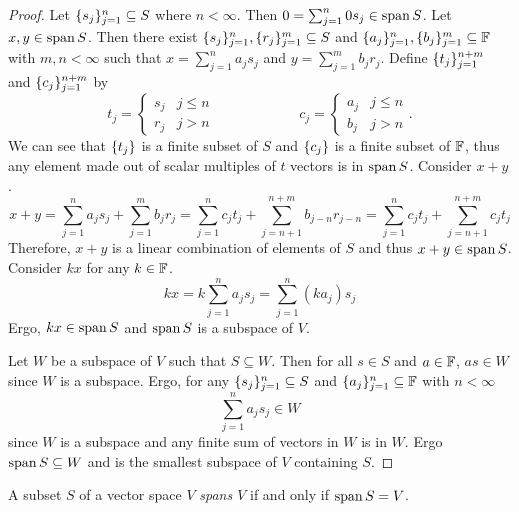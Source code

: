 \begin{proof}
	Let $\lbrace s_j \rbrace_{j=1}^n\subseteq S$ where $n < \infty$.
	Then $0=\sum_{j=1}^n 0 s_j\in\operatorname{span} S$.
	Let $x,y\in\operatorname{span} S$.
	Then there exist $\lbrace s_j \rbrace_{j=1}^n,\lbrace r_j \rbrace_{j=1}^m\subseteq S$ and $\lbrace a_j \rbrace_{j=1}^n,\lbrace b_j \rbrace_{j=1}^m\subseteq\mathbb{F}$ with $m,n <\infty$ such that $x=\sum_{j=1}^n a_js_j$ and $y=\sum_{j=1}^mb_jr_j$.
	Define $\lbrace t_j \rbrace_{j=1}^{n+m}$ and $\lbrace c_j \rbrace_{j=1}^{n+m}$ by
	\[
		t_j =
		\begin{cases}
			s_j & j\leq n\\
			r_j & j > n
		\end{cases}
		\hspace{1in}
		c_j =
		\begin{cases}
			a_j & j \leq n\\
			b_j & j > n
		\end{cases}.
	\]
	We can see that $\lbrace t_j \rbrace$ is a finite subset of $S$ and $\lbrace c_j \rbrace$ is a finite subset of $\mathbb{F}$, thus any element made out of scalar multiples of $t$ vectors is in $\operatorname{span} S$.
	Consider $x+y$.
	\[
		x+y = \sum_{j=1}^n a_js_j + \sum_{j=1}^mb_jr_j
		= \sum_{j=1}^n c_jt_j + \sum_{j=n+1}^{n+m}b_{j-n}r_{j-n}
		= \sum_{j=1}^n c_jt_j + \sum_{j=n+1}^{n+m} c_jt_j
	\]
	Therefore, $x+y$ is a linear combination of elements of $S$ and thus $x+y\in\operatorname{span} S$.
	Consider $kx$ for any $k\in\mathbb{F}$.
	\[
		kx=k\sum_{j=1}^n a_js_j=\sum_{j=1}^n (ka_j)s_j
	\]
	Ergo, $kx\in\operatorname{span} S$ and $\operatorname{span} S$ is a subspace of $V$.

	Let $W$ be a subspace of $V$ such that $S\subseteq W$.
	Then for all $s\in S$ and $a\in\mathbb{F}$, $as\in W$ since $W$ is a subspace.
	Ergo, for any $\lbrace s_j \rbrace_{j=1}^n\subseteq S$ and $\lbrace a_j \rbrace_{j=1}^n\subseteq\mathbb{F}$ with $n < \infty$
	\[
		\sum_{j=1}^n a_js_j\in W
	\]
	since $W$ is a subspace and any finite sum of vectors in $W$ is in $W$.
	Ergo $\operatorname{span} S\subseteq W$ and is the smallest subspace of $V$ containing $S$.
\end{proof}

\begin{definition}[Span]
A subset $S$ of a vector space $V$ \textit{spans $V$} if and only if $\operatorname{span} S=V$.
\end{definition}
